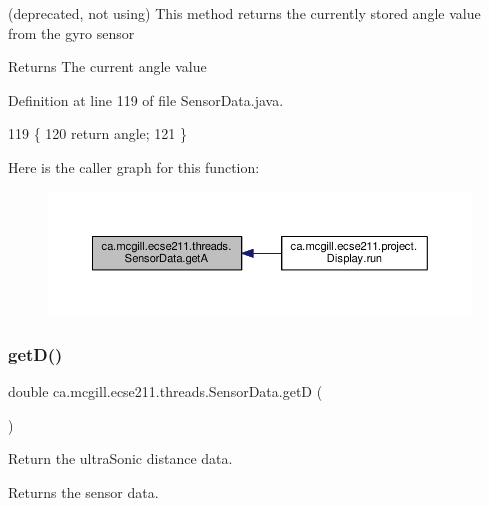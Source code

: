 (deprecated, not using) This method returns the currently stored angle value from the gyro sensor

\begin{DoxyReturn}{Returns}
The current angle value 
\end{DoxyReturn}


Definition at line 119 of file Sensor\+Data.\+java.


\begin{DoxyCode}
119                        \{
120     \textcolor{keywordflow}{return} angle;
121   \}
\end{DoxyCode}
Here is the caller graph for this function\+:\nopagebreak
\begin{figure}[H]
\begin{center}
\leavevmode
\includegraphics[width=350pt]{classca_1_1mcgill_1_1ecse211_1_1threads_1_1_sensor_data_acc8f6cc56f39c8ea6b812cd8b135eca6_icgraph}
\end{center}
\end{figure}
\mbox{\label{classca_1_1mcgill_1_1ecse211_1_1threads_1_1_sensor_data_a46cc30522719018a80f89624e0ce458f}} 
\subsubsection{\texorpdfstring{get\+D()}{getD()}}
{\footnotesize\ttfamily double ca.\+mcgill.\+ecse211.\+threads.\+Sensor\+Data.\+getD (\begin{DoxyParamCaption}{ }\end{DoxyParamCaption})}

Return the ultra\+Sonic distance data.

\begin{DoxyReturn}{Returns}
the sensor data. 
\end{DoxyReturn}


